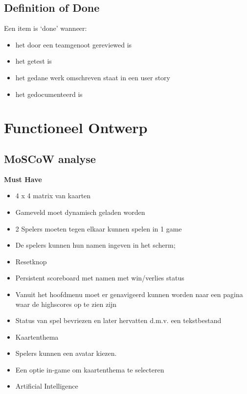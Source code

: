 \message{ !name(Document.tex)}\documentclass[a4paper,titlepage,11pt]{article}
\begin{document}
\subsection{Definition of Done}

Een item is `done' wanneer:

\begin{itemize}

\item het door een teamgenoot gereviewed is
\item het getest is
\item het gedane werk omschreven staat in een user story
\item het gedocumenteerd is
\end{itemize}

\clearpage

\section{Functioneel Ontwerp}

\subsection{MoSCoW analyse}

{\bf Must Have}

\begin{itemize}
\item 4 x 4 matrix van kaarten
\item Gameveld moet dynamisch geladen worden
\item 2 Spelers moeten tegen elkaar kunnen spelen in 1 game
\item De spelers kunnen hun namen ingeven in het scherm;
\item Resetknop
\item Persistent scoreboard met namen met win/verlies status
\item Vanuit het hoofdmenu moet er genavigeerd kunnen worden naar een pagina waar de 
  highscores op te zien zijn
\item Status van spel bevriezen en later hervatten d.m.v. een tekstbestand
\end{itemize}

\begin{itemize}
\item Kaartenthema
\end{itemize}
\begin{itemize}
\item Spelers kunnen een avatar kiezen.
\end{itemize}
\begin{itemize}
\item Een optie in-game om kaartenthema te selecteren
\item Artificial Intelligence
\end{itemize}
\end{document}
